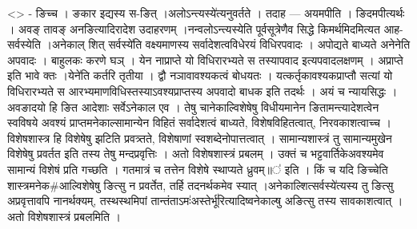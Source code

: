 \textless{}\textgreater{} - ङिच्च । ङकार इद्यस्य स-ङित्
।अलोऽन्त्यस्ये॑त्यनुवर्तते । तदाह --- अयमपीति । ङिदमपीत्यर्थः । अवङ्
तावङ् अनङित्यादिरादेश उदाहरणम् ।नन्वलोऽन्त्यस्येति पूर्वसूत्रेणैव सिद्धे
किमर्थमिदमित्यत आह-सर्वस्येति ।अनेकाल् शित् सर्वस्ये॑ति वक्ष्यमाणस्य
सर्वादेशत्वविधेरयं विधिरपवादः । अपोद्यते बाध्यते अनेनेति अपवादः ।
बाहुलकः करणे घञ् । येन नाप्राप्ते यो विधिरारभ्यते स तस्यापवाद
इत्यपवादलक्षणम् । अप्राप्ते इति भावे क्तः ।येने॑ति कर्तरि तृतीया । द्वौ
नञावावश्यकत्वं बोधयतः । यत्कर्तृकावश्यकप्राप्तौ सत्यां यो विधिरारभ्यते स
आरभ्यमाणविधिस्तस्याऽवश्यप्राप्तस्य अपवादो बाधक इति तदर्थः । अयं च
न्यायसिद्धः । अवङादयो हि ङित आदेशाः सर्वेऽनेकाल एव । तेषु
चानेकाल्विशेषेषु विधीयमानेन ङितामन्त्यादेशत्वेन स्वविषये अवश्यं
प्राप्तमनेकाल्सामान्येन विहितं सर्वादेशत्वं बाध्यते, विशेषविहितत्वात्,
निरवकाशत्वाच्च । विशेषशास्त्र हि विशेषेषु झटिति प्रवत्र्तते, विशेषाणां
स्वशब्देनोपात्तत्वात् । सामान्यशास्त्रं तु सामान्यमुखेन विशेषेषु
प्रवर्तत इति तस्य तेषु मन्दप्रवृत्तिः । अतो विशेषशास्त्रं प्रबलम् ।
उक्तं च भट्टवार्तिकेअवश्यमेव सामान्यं विशेषं प्रति गच्छति । गतमात्रं च
तत्तेन विशेषे स्थाप्यते ध्रुवम्॥॑ इति । किं च यदि ङिच्चेति
शास्त्रमनेक\#आल्विशेषेषु ङित्सु न प्रवर्तेत, तर्हि तदनर्थकमेव स्यात्
।अनेकाल्शित्सर्वस्ये॑त्यस्य तु ङित्सु अप्रवृत्तावपि नानर्थक्यम्,
तस्थस्थमिपां तान्तंताऽमः॑अस्तेर्भू॑रित्यादिष्वनेकाल्षु अङित्सु तस्य
सावकाशत्वात् । अतो विशेषशास्त्रं प्रबलमिति ।

